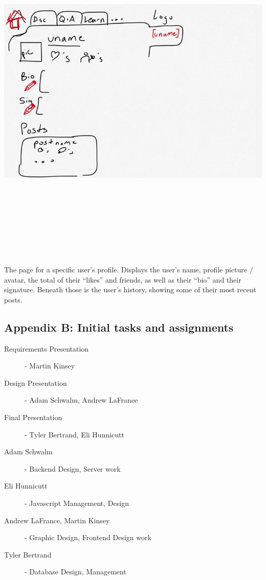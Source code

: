\documentclass[12pt]{scrartcl}
\begin{document}
\includegraphics[width=17cm, height=17cm, keepaspectratio]{profilepage.png}

The page for a specific user’s profile. Displays the user’s name, profile picture / avatar, the total of their “likes” and friends, as well as their “bio” and their signature. Beneath those is the user’s history, showing some of their most recent posts.

\subsection{Appendix B: Initial tasks and assignments}
\begin{description}
\item [Requirements Presentation] - Martin Kinsey
\item [Design Presentation] - Adam Schwalm, Andrew LaFrance
\item [Final Presentation] - Tyler Bertrand, Eli Hunnicutt
\vspace{4mm}
\item [Adam Schwalm] - Backend Design, Server work
\item [Eli Hunnicutt] - Javascript Management, Design
\item [Andrew LaFrance, Martin Kinsey] - Graphic Design, Frontend Design work
\item [Tyler Bertrand] - Database Design, Management
\end{description}
\end{document}
